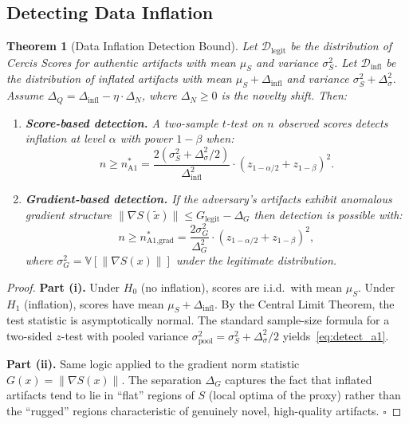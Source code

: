 \documentclass[11pt,a4paper]{article}
\theoremstyle{plain}
\newtheorem{theorem}{Theorem}[section]
\theoremstyle{definition}
\theoremstyle{remark}
\newcommand{\bbV}{\mathbb{V}}
\newcommand{\cD}{\mathcal{D}}
\begin{document}
\subsection{Detecting Data Inflation}
\label{sec:bound_a1}
\begin{theorem}[Data Inflation Detection Bound]\label{thm:a1_detect}
  Let \(\cD_{\text{legit}}\) be the distribution of Cercis Scores for authentic artifacts
  with mean \(\mu_S\) and variance \(\sigma_S^2\). Let \(\cD_{\text{infl}}\) be the distribution
  of inflated artifacts with mean \(\mu_S + \Delta_{\text{infl}}\) and variance
  \(\sigma_S^2 + \Delta_\sigma^2\). Assume \(\Delta_Q = \Delta_{\text{infl}} - \eta \cdot \Delta_N\),
  where \(\Delta_N \geq 0\) is the novelty shift. Then:
  \begin{enumerate}[label=(\roman*)]
    \item \textbf{Score-based detection.} A two-sample \(t\)-test on \(n\) observed scores
          detects inflation at level \(\alpha\) with power \(1-\beta\) when:
          \begin{equation}\label{eq:detect_a1}
            n \geq n_{\text{A1}}^* =
            \frac{2(\sigma_S^2 + \Delta_\sigma^2/2)}{\Delta_{\text{infl}}^2}
            \cdot (z_{1-\alpha/2} + z_{1-\beta})^2.
          \end{equation}
    \item \textbf{Gradient-based detection.} If the adversary's artifacts exhibit
          anomalous gradient structure \(\|\nabla S(\tilde{x})\| \leq G_{\text{legit}} - \Delta_G\)
          then detection is possible with:
          \begin{equation}\label{eq:detect_a1_grad}
            n \geq n_{\text{A1,grad}}^* =
            \frac{2\sigma_G^2}{\Delta_G^2} \cdot (z_{1-\alpha/2} + z_{1-\beta})^2,
          \end{equation}
          where \(\sigma_G^2 = \bbV[\|\nabla S(x)\|]\) under the legitimate distribution.
  \end{enumerate}
\end{theorem}
\begin{proof}
  \textbf{Part (i).} Under \(H_0\) (no inflation), scores are i.i.d.\ with mean \(\mu_S\).
  Under \(H_1\) (inflation), scores have mean \(\mu_S + \Delta_{\text{infl}}\).
  By the Central Limit Theorem, the test statistic is asymptotically normal.
  The standard sample-size formula for a two-sided \(z\)-test with pooled variance
  \(\sigma_{\text{pool}}^2 = \sigma_S^2 + \Delta_\sigma^2/2\) yields~\eqref{eq:detect_a1}.
  
  \textbf{Part (ii).} Same logic applied to the gradient norm statistic
  \(G(x) = \|\nabla S(x)\|\). The separation \(\Delta_G\) captures the fact that inflated
  artifacts tend to lie in ``flat'' regions of \(S\) (local optima of the proxy) rather
  than the ``rugged'' regions characteristic of genuinely novel, high-quality artifacts.
  \hfill \(\square\)
\end{proof}
\end{document}

